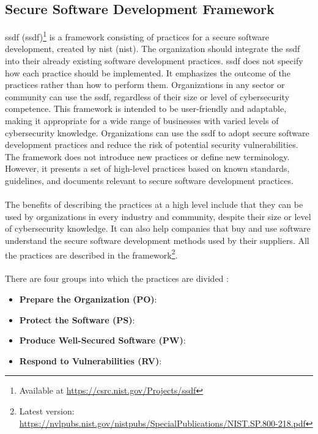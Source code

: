 \subsection{Secure Software Development Framework}
\label{ssdf}
\acrlong{ssdf} (\acrshort{ssdf})\footnote{Available at \url{https://csrc.nist.gov/Projects/ssdf}} is a framework consisting of practices for a secure software development, created by \acrlong{nist} (\acrshort{nist}). The organization should integrate the \acrshort{ssdf} into their already existing software development practices. \acrshort{ssdf} does not specify how each practice should be implemented. It emphasizes the outcome of the practices rather than how to perform them. Organizations in any sector or community can use the \acrshort{ssdf}, regardless of their size or level of cybersecurity competence. This framework is intended to be user-friendly and adaptable, making it appropriate for a wide range of businesses with varied levels of cybersecurity knowledge. Organizations can use the \acrshort{ssdf} to adopt secure software development practices and reduce the risk of potential security vulnerabilities. The framework does not introduce new practices or define new terminology. However, it presents a set of high-level practices based on known standards, guidelines, and documents relevant to secure software development practices. 
\\~\\
The benefits of describing the practices at a high level include that they can be used by organizations in every industry and community, despite their size or level of cybersecurity knowledge. It can also help companies that buy and use software understand the secure software development methods used by their suppliers. All the practices are described in the framework\footnote{Latest version: \url{https://nvlpubs.nist.gov/nistpubs/SpecialPublications/NIST.SP.800-218.pdf}}.
\\~\\
There are four groups into which the practices are divided \cite{ssdf}:
\begin{itemize}
  \item \textbf{Prepare the Organization (PO)}: \textit{}
  \item \textbf{Protect the Software (PS)}: \textit{}
  \item \textbf{Produce Well-Secured Software (PW)}: \textit{}
  \item \textbf{Respond to Vulnerabilities (RV)}: \textit{}
\end{itemize}

